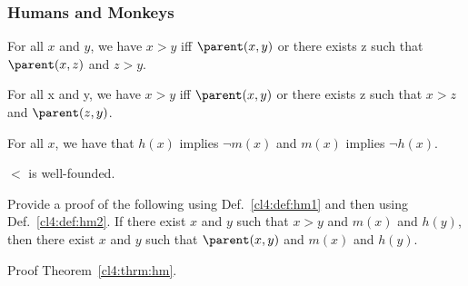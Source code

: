 \subsubsection{Humans and Monkeys}

\begin{definition}
\label{cl4:def:hm1}
For all $x$ and $y$, we have $x > y$ iff $\parent(x,y)$ or there exists z such that $\parent(x,z)$ and $z > y$.
\end{definition}
\begin{definition} 
\label{cl4:def:hm2}
For all x and y, we have $x > y$ iff $\parent(x,y)$ or there exists z such that $x > z$ and $\parent(z,y)$.
\end{definition}


\begin{axiom}For all $x$, we have that $h(x)$ implies $\neg m(x)$ and $m(x)$ implies $\neg h(x)$.
\end{axiom}

\begin{axiom} 
$<$ is well-founded.
\end{axiom}



\begin{theorem}
\label{cl4:thrm:hm}
Provide a proof of the following using Def.~\ref{cl4:def:hm1} and then using Def.~\ref{cl4:def:hm2}. If there exist $x$ and $y$ such that $x > y$ and $m(x)$ and $h(y)$, then there exist $x$ and $y$ such that $\parent(x,y)$ and $m(x)$ and $h(y)$.
\end{theorem}

\begin{exercise}
Proof Theorem~\ref{cl4:thrm:hm}.
\end{exercise}